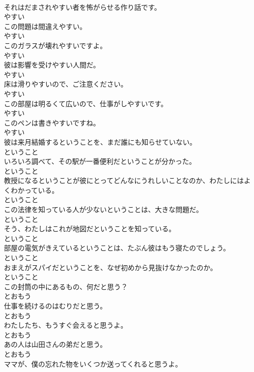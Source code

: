 \documentclass[8pt]{extreport}
\begin{document}
\begin{CJK}{UTF8}{min}
\\	それはだまされやすい者を怖がらせる作り話です。	
\\	やすい
\\	この問題は間違えやすい。	
\\	やすい
\\	このガラスが壊れやすいですよ。	
\\	やすい
\\	彼は影響を受けやすい人間だ。	
\\	やすい
\\	床は滑りやすいので、ご注意ください。	
\\	やすい
\\	この部屋は明るくて広いので、仕事がしやすいです。	
\\	やすい
\\	このペンは書きやすいですね。	
\\	やすい
\\	彼は来月結婚するということを、まだ誰にも知らせていない。	
\\	ということ
\\	いろいろ調べて、その駅が一番便利だということが分かった。	
\\	ということ
\\	教授になるということが彼にとってどんなにうれしいことなのか、わたしにはよくわかっている。	
\\	ということ
\\	この法律を知っている人が少ないということは、大きな問題だ。	
\\	ということ
\\	そう、わたしはこれが地図だということを知っている。	
\\	ということ
\\	部屋の電気がきえているということは、たぶん彼はもう寝たのでしょう。	
\\	ということ
\\	おまえがスパイだということを、なぜ初めから見抜けなかったのか。	
\\	ということ
\\	この封筒の中にあるもの、何だと思う？	
\\	とおもう
\\	仕事を続けるのはむりだと思う。	
\\	とおもう
\\	わたしたち、もうすぐ会えると思うよ。	
\\	とおもう
\\	あの人は山田さんの弟だと思う。	
\\	とおもう
\\	ママが、僕の忘れた物をいくつか送ってくれると思うよ。	

\end{CJK}
\end{document}
